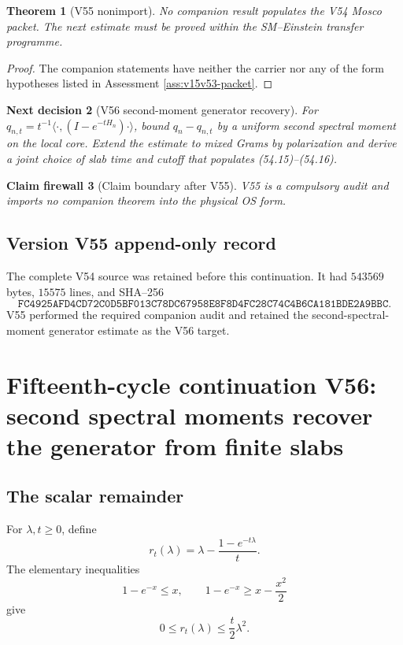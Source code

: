 \documentclass[11pt]{article}
\newtheorem{theorem}{Theorem}[section]
\newtheorem{firewall}[theorem]{Claim firewall}
\newtheorem{decision}[theorem]{Next decision}
\theoremstyle{remark}
\begin{document}
\begin{theorem}[V55 nonimport]
\label{thm:v15v55-audit}
No companion result populates the V54 Mosco packet.  The next
estimate must be proved within the SM--Einstein transfer programme.
\end{theorem}

\begin{proof}
The companion statements have neither the carrier nor any of the
form hypotheses listed in Assessment \ref{ass:v15v53-packet}.
\end{proof}

\begin{decision}[V56 second-moment generator recovery]
\label{dec:v15v55-next}
For \(q_{n,t}=t^{-1}\langle\cdot,(I-e^{-tH_n})\cdot\rangle\),
bound \(q_n-q_{n,t}\) by a uniform second spectral moment on the
local core.  Extend the estimate to mixed Grams by polarization and
derive a joint choice of slab time and cutoff that populates
(54.15)--(54.16).
\end{decision}

\begin{firewall}[Claim boundary after V55]
\label{fire:v15v55}
V55 is a compulsory audit and imports no companion theorem into the
physical OS form.
\end{firewall}

\section*{Version V55 append-only record}
The complete V54 source was retained before this continuation.  It
had \(543569\) bytes, \(15575\) lines, and SHA--256
\[
 \texttt{FC4925AFD4CD72C0D5BF013C78DC67958E8F8D4FC28C74C4B6CA181BDE2A9BBC}.
\]
V55 performed the required companion audit and retained the
second-spectral-moment generator estimate as the V56 target.

\chapter{Fifteenth-cycle continuation V56: second spectral moments recover the generator from finite slabs}
\label{sec:v15v56}

\section{The scalar remainder}

For \(\lambda,t\geq0\), define
\[
 r_t(\lambda)=
 \lambda-\frac{1-e^{-t\lambda}}t.                       \tag{56.1}
\]
The elementary inequalities
\[
 1-e^{-x}\leq x,\qquad
 1-e^{-x}\geq x-\frac{x^2}{2}                           \tag{56.2}
\]
give
\[
 \boxed{0\leq r_t(\lambda)\leq\frac t2\lambda^2.}       \tag{56.3}
\]
\end{document}
